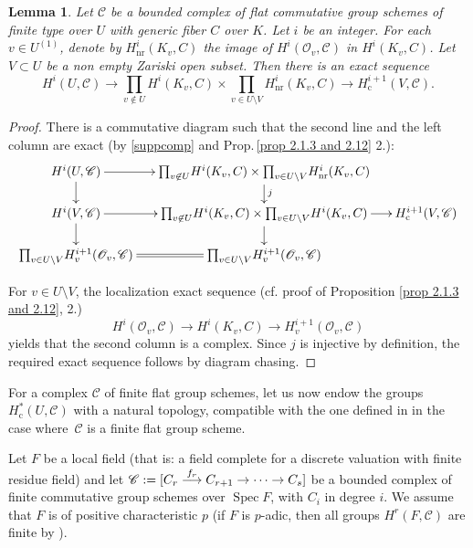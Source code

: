 \documentclass[11pt]{article}
\newcommand{\cf}{cf.\xspace}
\let\mathcal\mathscr
\newcommand\To[1]{\mathchoice{\xrightarrow{\textstyle\kern4pt#1\kern3pt}}{\stackrel{#1}{\longrightarrow}}{}{}}
\newcommand{\tprod}{{\textstyle\prod}}
\newcommand{\rc}{\mathrm{c}}
\theoremstyle{plain}
\newtheorem{lem}[theo]{Lemma}
\theoremstyle{definition}
\DeclareMathOperator \spec {Spec}
\newcommand\cO {\mathcal{O}}
\newcommand \cC {\mathcal{C}}
\newcommand \nr {\mathrm{nr}}
\begin{document}
\begin{lem} \label{uvlem}
Let $\cC$ be a bounded complex of flat commutative group schemes
of finite type over $U$ with generic fiber $C$ over $K$. Let $i$ be an integer.
For each $v \in U^{(1)}$, denote by $H^i_{\nr}(K_v,C)$ the image of
$H^i(\cO_v,\mathcal C)$ in $H^i(K_v,C)$.
Let $V \subset U$ be a non empty Zariski open subset.
Then there is an exact sequence
\[
H^i(U,\mathcal C) \to \tprod_{v \not \in U} H^i(K_v,C) \times
\tprod_{v \in U \setminus V} H^i_{\nr}(K_v,C) \to H^{i+1}_\rc(V,\mathcal C).
\]
\end{lem}

\begin{proof} There is a commutative diagram such that the second line and the
left column are exact (by \eqref{suppcomp} and Prop.\,\ref{prop 2.1.3 and 2.12} 2.):
\[
\begin{array}{c}
\xymatrix@=5mm{
H^i(U,\mathcal C) \ar[r]\ar[d]& \tprod_{v \not \in U} H^i(K_v,C) \times
\tprod_{v \in U \setminus V} H^i_{\nr}(K_v,C)\ar[d]^j\\
H^i(V,\mathcal C) \ar[r]\ar[d]& \tprod_{v \not \in U} H^i(K_v,C) \times
\tprod_{v \in U \setminus V} H^i(K_v,C) \ar[r]\ar[d]& H^{i+1}_\rc(V,\mathcal C)\\
\tprod_{v \in U\setminus V} H^{i+1}_v(\cO_v,\mathcal C)\ar@{=}[r]&
\tprod_{v \in U\setminus V} H^{i+1}_v(\cO_v,\mathcal C)
}
\end{array}
\]

For $v \in U\setminus V$, the localization exact sequence (\cf proof of
Proposition \ref{prop 2.1.3 and 2.12}, 2.)
\[
H^i(\cO_v,\mathcal C) \to H^i(K_v,C) \to H^{i+1}_v(\cO_v,\mathcal C)
\]
yields that
the second column is a complex. Since $j$ is injective by definition, the
required exact sequence follows by diagram chasing.
\end{proof}

For a complex $\cC$ of finite flat group schemes,
let us now endow the groups $H^*_\rc(U, \cC)$ with a natural topology, compatible with the one defined in \cite{DemH} in the case where~$\cC$ is a finite flat group scheme.

Let $F$ be a local field (that is: a field complete for a discrete valuation
with finite residue field) and let $\cC:= [C_r \To{f_r} C_{r+1} \to \cdots \to C_s]$ be a bounded complex of finite commutative group schemes over $\spec F$, with $C_i$ in degree $i$. We assume that $F$ is of positive
characteristic $p$ (if $F$ is $p$-adic, then all
groups $H^r(F,\mathcal C)$ are finite by \cite[Cor.\,I.2.3]{MilADT}).
\end{document}
